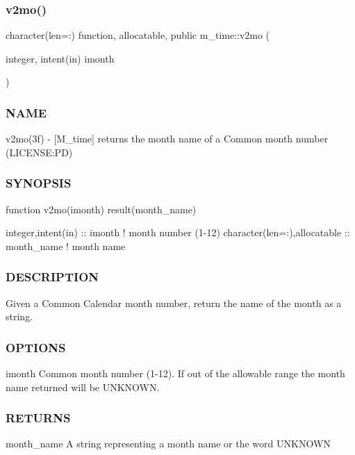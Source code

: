 \subsubsection{\texorpdfstring{v2mo()}{v2mo()}}
{\footnotesize\ttfamily character(len=\+:) function, allocatable, public m\+\_\+time\+::v2mo (\begin{DoxyParamCaption}\item[{integer, intent(in)}]{imonth }\end{DoxyParamCaption})}



\subsubsection*{N\+A\+ME}

v2mo(3f) -\/ \mbox{[}M\+\_\+time\mbox{]} returns the month name of a Common month number (L\+I\+C\+E\+N\+SE\+:PD) 

\subsubsection*{S\+Y\+N\+O\+P\+S\+IS}

\begin{DoxyVerb}function v2mo(imonth) result(month_name)

 integer,intent(in)           :: imonth      ! month number (1-12)
 character(len=:),allocatable :: month_name  ! month name
\end{DoxyVerb}


\subsubsection*{D\+E\+S\+C\+R\+I\+P\+T\+I\+ON}

Given a Common Calendar month number, return the name of the month as a string.

\subsubsection*{O\+P\+T\+I\+O\+NS}

imonth Common month number (1-\/12). If out of the allowable range the month name returned will be \textquotesingle{}U\+N\+K\+N\+O\+WN\textquotesingle{}. \subsubsection*{R\+E\+T\+U\+R\+NS}

month\+\_\+name A string representing a month name or the word \textquotesingle{}U\+N\+K\+N\+O\+WN\textquotesingle{}

